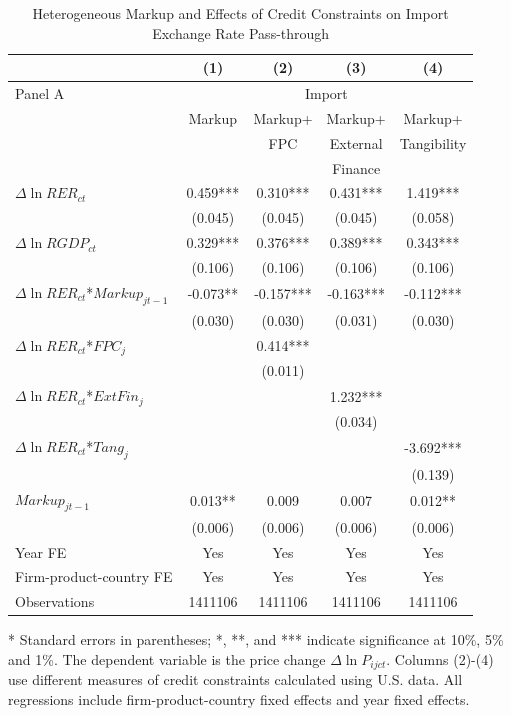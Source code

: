 \documentclass[12pt]{article}
\begin{document}
\begin{table}[htbp]
	\centering
	\caption{Heterogeneous Markup and Effects of Credit Constraints on Import Exchange Rate Pass-through}
	\begin{threeparttable}
		\begin{tabular}{lcccc}
			\midrule          & (1)   & (2)   & (3)   & (4)     \\
			\midrule
			Panel A & \multicolumn{4}{c}{Import} \\
			& Markup & Markup+& Markup+ & Markup+      \\
			&       &FPC& External & Tangibility        \\
			&       & & Finance &  	          \\
			\midrule
			$\Delta \ln RER_{ct}$ & 0.459*** & 0.310*** & 0.431*** & 1.419***   \\
			& (0.045) & (0.045) & (0.045) & (0.058) \\
			$\Delta \ln RGDP_{ct}$ & 0.329*** & 0.376*** & 0.389*** & 0.343*** \\
			& (0.106) & (0.106) & (0.106) & (0.106)  \\
			$\Delta \ln RER_{ct}$*$Markup_{jt-1}$ & -0.073** & -0.157*** & -0.163*** & -0.112*** \\
			& (0.030) & (0.030) & (0.031) & (0.030) \\
			$\Delta \ln RER_{ct}$*$FPC_{j}$ &       & 0.414*** &       &  \\
			&       & (0.011) &       &   \\
			$\Delta \ln RER_{ct}$*$ExtFin_{j}$ &       &       & 1.232*** &  \\
			&       &       & (0.034) &   \\
			$\Delta \ln RER_{ct}$*$Tang_{j}$  &       &       &       & -3.692*** \\
			&       &       &       & (0.139) \\
			$Markup_{jt-1}$ & 0.013** & 0.009 & 0.007 & 0.012**  \\
			& (0.006) & (0.006) & (0.006) & (0.006)  \\
			Year FE  & Yes   & Yes   & Yes   & Yes       \\
			Firm-product-country FE & Yes   & Yes   & Yes   & Yes       \\
			Observations & 1411106 & 1411106 & 1411106 & 1411106  \\
			\bottomrule
		\end{tabular}
		\begin{tablenotes}
			\footnotesize
			\item[*] Standard errors in parentheses; *, **, and *** indicate significance at 10\%, 5\% and 1\%. The dependent variable is the price change $\Delta \ln P_{ijct}$. Columns (2)-(4) use different measures of credit constraints calculated using U.S. data. All regressions include firm-product-country fixed effects and year fixed effects.
		\end{tablenotes}
	\end{threeparttable}
        \label{tab.markup}
\end{table}
\end{document}
